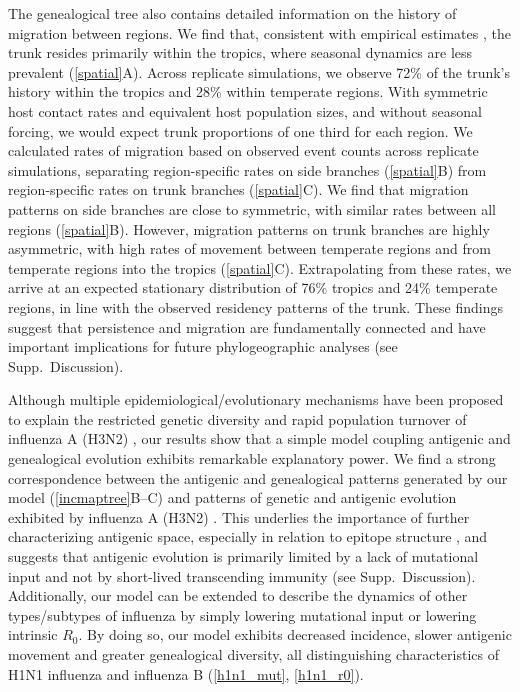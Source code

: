 The genealogical tree also contains detailed information on the history of migration between regions.  We find that, consistent with empirical estimates \cite{Russell08,Bedford10}, the trunk resides primarily within the tropics, where seasonal dynamics are less prevalent (\ref{spatial}A).  Across replicate simulations, we observe 72\% of the trunk's history within the tropics and 28\% within temperate regions.  With symmetric host contact rates and equivalent host population sizes, and without seasonal forcing, we would expect trunk proportions of one third for each region.  We calculated rates of migration based on observed event counts across replicate simulations, separating region-specific rates on side branches (\ref{spatial}B) from region-specific rates on trunk branches (\ref{spatial}C).  We find that migration patterns on side branches are close to symmetric, with similar rates between all regions (\ref{spatial}B).  However, migration patterns on trunk branches are highly asymmetric, with high rates of movement between temperate regions and from temperate regions into the tropics (\ref{spatial}C).  Extrapolating from these rates, we arrive at an expected stationary distribution of 76\% tropics and 24\% temperate regions, in line with the observed residency patterns of the trunk.  These findings suggest that persistence and migration are fundamentally connected and have important implications for future phylogeographic analyses (see Supp.\ Discussion).

Although multiple epidemiological/evolutionary mechanisms have been proposed to explain the restricted genetic diversity and rapid population turnover of influenza A (H3N2) \cite{Ferguson03,Tria05,Koelle06,Recker07}, our results show that a simple model coupling antigenic and genealogical evolution exhibits remarkable explanatory power.  We find a strong correspondence between the antigenic and genealogical patterns generated by our model (\ref{incmaptree}B--C) and patterns of genetic and antigenic evolution exhibited by influenza A (H3N2) \cite{Fitch97,Smith04}.  This underlies the importance of further characterizing antigenic space, especially in relation to epitope structure \cite{Recker07}, and suggests that antigenic evolution is primarily limited by a lack of mutational input and not by short-lived transcending immunity (see Supp.~Discussion).  Additionally, our model can be extended to describe the dynamics of other types/subtypes of influenza by simply lowering mutational input or lowering intrinsic $R_0$.  By doing so, our model exhibits decreased incidence, slower antigenic movement and greater genealogical diversity, all distinguishing characteristics of H1N1 influenza and influenza B (\ref{h1n1_mut}, \ref{h1n1_r0}).

